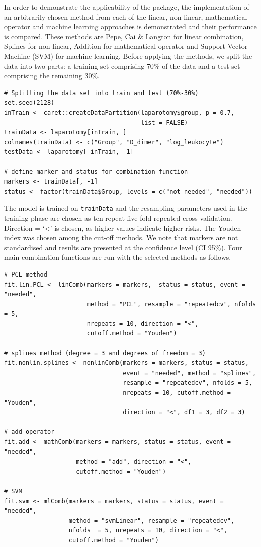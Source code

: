 In order to demonstrate the applicability of the  package, the implementation of an arbitrarily chosen method from each of the linear, non-linear, mathematical operator and machine learning approaches is demonstrated and their performance is compared. These methods are Pepe, Cai \& Langton for linear combination, Splines for non-linear, Addition for mathematical operator and Support Vector Machine (SVM) for machine-learning. Before applying the methods, we split the data into two parts: a training set comprising 70\% of the data and a test set comprising the remaining 30\%.

\begin{verbatim}
# Splitting the data set into train and test (70%-30%)
set.seed(2128)
inTrain <- caret::createDataPartition(laparotomy$group, p = 0.7,
                                      list = FALSE)
trainData <- laparotomy[inTrain, ]
colnames(trainData) <- c("Group", "D_dimer", "log_leukocyte")
testData <- laparotomy[-inTrain, -1]

# define marker and status for combination function
markers <- trainData[, -1]
status <- factor(trainData$Group, levels = c("not_needed", "needed"))
\end{verbatim}

The model is trained on \texttt{trainData} and the resampling parameters used in the training phase are chosen as ten repeat five fold repeated cross-validation. Direction = `\textless' is chosen, as higher values indicate higher risks. The Youden index was chosen among the cut-off methods. We note that markers are not standardised and results are presented at the confidence level (CI 95\%). Four main combination functions are run with the selected methods as follows.

\begin{verbatim}
# PCL method
fit.lin.PCL <- linComb(markers = markers,  status = status, event = "needed",
                       method = "PCL", resample = "repeatedcv", nfolds = 5,
                       nrepeats = 10, direction = "<",
                       cutoff.method = "Youden")

# splines method (degree = 3 and degrees of freedom = 3)
fit.nonlin.splines <- nonlinComb(markers = markers, status = status,
                                 event = "needed", method = "splines",
                                 resample = "repeatedcv", nfolds = 5,
                                 nrepeats = 10, cutoff.method = "Youden",
                                 direction = "<", df1 = 3, df2 = 3)

# add operator
fit.add <- mathComb(markers = markers, status = status, event = "needed",
                    method = "add", direction = "<",
                    cutoff.method = "Youden")

# SVM
fit.svm <- mlComb(markers = markers, status = status, event = "needed",
                  method = "svmLinear", resample = "repeatedcv",
                  nfolds  = 5, nrepeats = 10, direction = "<",
                  cutoff.method = "Youden")
\end{verbatim}

